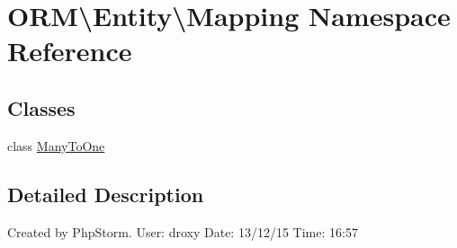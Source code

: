\hypertarget{namespaceORM_1_1Entity_1_1Mapping}{}\section{O\+RM\textbackslash{}Entity\textbackslash{}Mapping Namespace Reference}
\label{namespaceORM_1_1Entity_1_1Mapping}
\subsection*{Classes}
\begin{DoxyCompactItemize}
\item 
class \hyperlink{classORM_1_1Entity_1_1Mapping_1_1ManyToOne}{Many\+To\+One}
\end{DoxyCompactItemize}


\subsection{Detailed Description}
Created by Php\+Storm. User\+: droxy Date\+: 13/12/15 Time\+: 16\+:57 
